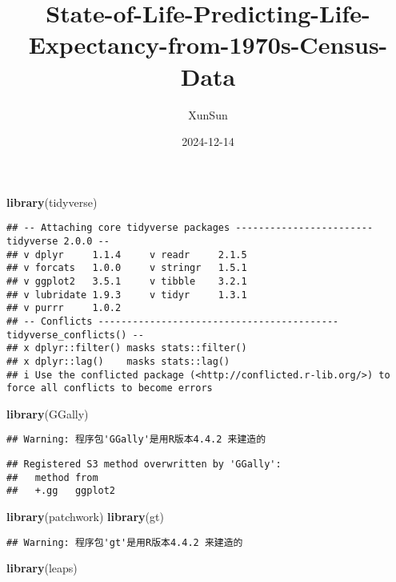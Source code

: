 \documentclass[
]{article}
\title{State-of-Life-Predicting-Life-Expectancy-from-1970s-Census-Data}
\author{XunSun}
\date{2024-12-14}
\newenvironment{Shaded}{\begin{snugshade}}{\end{snugshade}}
\newcommand{\FunctionTok}[1]{\textcolor[rgb]{0.13,0.29,0.53}{\textbf{#1}}}
\newcommand{\NormalTok}[1]{#1}
\begin{document}
\maketitle

\begin{Shaded}
\begin{Highlighting}[]
\FunctionTok{library}\NormalTok{(tidyverse)}
\end{Highlighting}
\end{Shaded}

\begin{verbatim}
## -- Attaching core tidyverse packages ------------------------ tidyverse 2.0.0 --
## v dplyr     1.1.4     v readr     2.1.5
## v forcats   1.0.0     v stringr   1.5.1
## v ggplot2   3.5.1     v tibble    3.2.1
## v lubridate 1.9.3     v tidyr     1.3.1
## v purrr     1.0.2     
## -- Conflicts ------------------------------------------ tidyverse_conflicts() --
## x dplyr::filter() masks stats::filter()
## x dplyr::lag()    masks stats::lag()
## i Use the conflicted package (<http://conflicted.r-lib.org/>) to force all conflicts to become errors
\end{verbatim}

\begin{Shaded}
\begin{Highlighting}[]
\FunctionTok{library}\NormalTok{(GGally)}
\end{Highlighting}
\end{Shaded}

\begin{verbatim}
## Warning: 程序包'GGally'是用R版本4.4.2 来建造的
\end{verbatim}

\begin{verbatim}
## Registered S3 method overwritten by 'GGally':
##   method from   
##   +.gg   ggplot2
\end{verbatim}

\begin{Shaded}
\begin{Highlighting}[]
\FunctionTok{library}\NormalTok{(patchwork)}
\FunctionTok{library}\NormalTok{(gt)}
\end{Highlighting}
\end{Shaded}

\begin{verbatim}
## Warning: 程序包'gt'是用R版本4.4.2 来建造的
\end{verbatim}

\begin{Shaded}
\begin{Highlighting}[]
\FunctionTok{library}\NormalTok{(leaps)}
\end{Highlighting}
\end{Shaded}
\end{document}
